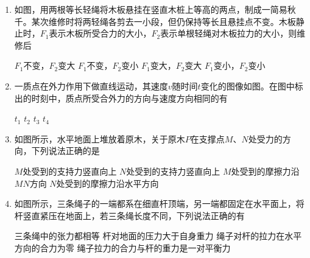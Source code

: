 \begin{enumerate}[leftmargin=0em]
\item 
{}
如图，用两根等长轻绳将木板悬挂在竖直木桩上等高的两点，制成一简易秋千。某次维修时将两轻绳各剪去一小段，但仍保持等长且悬挂点不变。木板静止时，$ F_{1} $表示木板所受合力的大小，$ F_{2} $表示单根轻绳对木板拉力的大小，则维修后  
\begin{figure}[h!]
\centering

\end{figure}


\fourchoices
{$ F_{1} $不变，$ F_{2} $变大 }
{$ F_{1} $不变，$ F_{2} $变小}
{$ F_{1} $变大，$ F_{2} $变大}
{$ F_{1} $变小，$ F_{2} $变小}



\item 
{}
一质点在外力作用下做直线运动，其速度$ v $随时间$ t $变化的图像如图。在图中标出的时刻中，质点所受合外力的方向与速度方向相同的有  
\begin{figure}[h!]
\centering

\end{figure}


\fourchoices
{$ t_{1} $}
{$ t_{2} $}
{$ t_{3} $}
{$ t_{4} $}




\item 
{}
如图所示，水平地面上堆放着原木，关于原木$ P $在支撑点$ M $、$ N $处受力的方向，下列说法正确的是  
\begin{figure}[h!]
\centering

\end{figure}


\fourchoices
{$ M $处受到的支持力竖直向上}
{$ N $处受到的支持力竖直向上}
{$ M $处受到的摩擦力沿$ MN $方向}
{$ N $处受到的摩擦力沿水平方向}

\item 
{}
如图所示，三条绳子的一端都系在细直杆顶端，另一端都固定在水平面上，将杆竖直紧压在地面上，若三条绳长度不同，下列说法正确的有  
\begin{figure}[h!]
\centering

\end{figure}

\fourchoices
{三条绳中的张力都相等}
{杆对地面的压力大于自身重力}
{绳子对杆的拉力在水平方向的合力为零}
{绳子拉力的合力与杆的重力是一对平衡力}








\end{enumerate}



